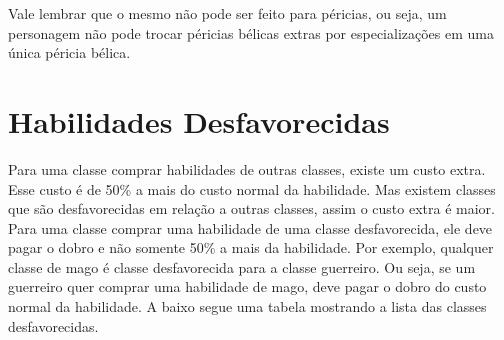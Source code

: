Vale lembrar que o mesmo não pode ser feito para péricias, ou seja, um personagem não pode trocar péricias bélicas extras por especializações em uma única péricia bélica. 


\section{Habilidades Desfavorecidas}

Para uma classe comprar habilidades de outras classes, existe um custo extra. Esse custo é de 50\% a mais do custo normal da habilidade. Mas existem classes que são desfavorecidas em relação a outras classes, assim o custo extra é maior. Para uma classe comprar uma habilidade de uma classe desfavorecida, ele deve pagar o dobro e não somente 50\% a mais da habilidade. Por exemplo, qualquer classe de mago é classe desfavorecida para a classe guerreiro. Ou seja, se um guerreiro quer comprar uma habilidade de mago, deve pagar o dobro do custo normal da habilidade. A baixo segue uma tabela mostrando a lista das classes desfavorecidas.


